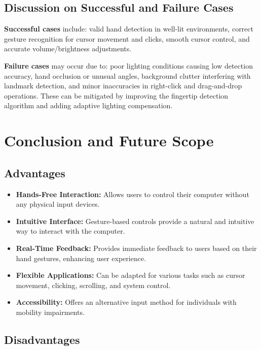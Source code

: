\documentclass[12pt,a4paper]{report}
\begin{document}
\section{Discussion on Successful and Failure Cases}

\textbf{Successful cases} include: valid hand detection in well-lit environments, correct
gesture recognition for cursor movement and clicks, smooth cursor control, and accurate
volume/brightness adjustments.

\textbf{Failure cases} may occur due to: poor lighting conditions causing low detection
accuracy, hand occlusion or unusual angles, background clutter interfering with landmark
detection, and minor inaccuracies in right-click and drag-and-drop operations. These can be
mitigated by improving the fingertip detection algorithm and adding adaptive lighting
compensation.

\chapter{Conclusion and Future Scope}

\section{Advantages}

\begin{itemize}[noitemsep]
  \item \textbf{Hands-Free Interaction:} Allows users to control their computer without any
    physical input devices.
  \item \textbf{Intuitive Interface:} Gesture-based controls provide a natural and intuitive
    way to interact with the computer.
  \item \textbf{Real-Time Feedback:} Provides immediate feedback to users based on their hand
    gestures, enhancing user experience.
  \item \textbf{Flexible Applications:} Can be adapted for various tasks such as cursor
    movement, clicking, scrolling, and system control.
  \item \textbf{Accessibility:} Offers an alternative input method for individuals with
    mobility impairments.
\end{itemize}

\section{Disadvantages}
\end{document}
